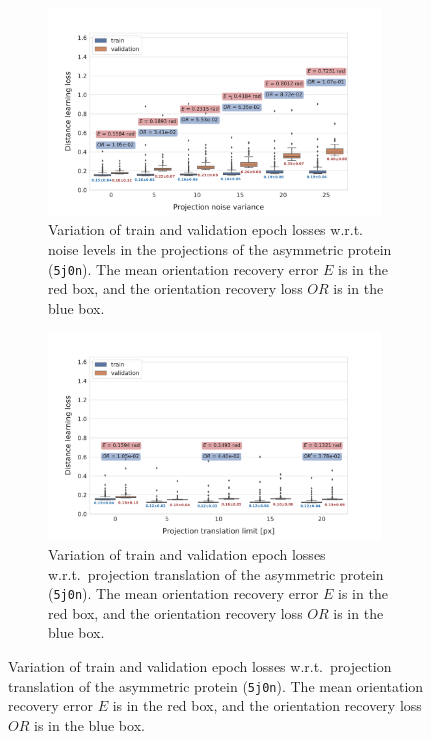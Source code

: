 \begin{figure}[ht!]
    \centering
    \begin{subfigure}[b]{0.47\textwidth}
        \includegraphics[height=5.5cm,valign=t]{figures/de_noises_nums}
        \caption{%
            Variation of train and validation epoch losses w.r.t. noise levels in the projections of the asymmetric protein (\texttt{5j0n}). The mean orientation recovery error $E$ is in the red box, and the orientation recovery loss $OR$ is in the blue box.
        }\label{fig:distance-estimation-vary-projection-noise}
    \end{subfigure}
    \hfill
    \begin{subfigure}[b]{0.47\textwidth}
        \includegraphics[height=5.5cm,valign=t]{figures/de_translation_nums}
        \caption{
        Variation of train and validation epoch losses w.r.t.\ projection translation of the asymmetric protein (\texttt{5j0n}). The mean orientation recovery error $E$ is in the red box, and the orientation recovery loss $OR$ is in the blue box.
    }\label{fig:distance-estimation-vary-projection-translation}
    \end{subfigure}
\end{figure}


